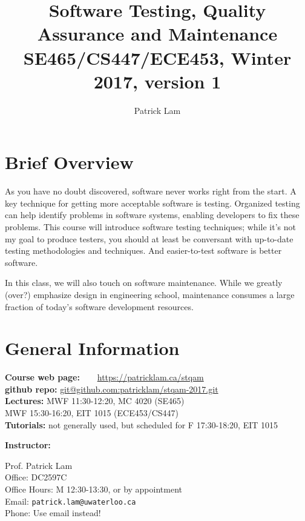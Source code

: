 \documentclass{article}
\begin{document}
\title{Software Testing, Quality Assurance and Maintenance\\SE465/CS447/ECE453, Winter 2017, version 1}
\author{Patrick Lam}
\renewcommand{\today}{}
\maketitle
\vspace*{-2em}

\section*{Brief Overview}
As you have no doubt discovered, software never works right from the
start. A key technique for getting more acceptable software is
testing. Organized testing can help identify problems in software
systems, enabling developers to fix these problems.  This course will
introduce software testing techniques; while it's not my goal
to produce testers, you should at least be conversant
with up-to-date testing methodologies and techniques. And easier-to-test
software is better software.

In this class, we will also touch on software maintenance. While we
greatly (over?) emphasize design in engineering school, maintenance
consumes a large fraction of today's software development resources.

\section*{General Information}

\noindent
\begin{tabbing}
  {\bf Course web page:~~~} \= \url{https://patricklam.ca/stqam}\\
  {\bf github repo:}\> \url{git@github.com:patricklam/stqam-2017.git}\\
  {\bf Lectures:} \> MWF 11:30-12:20, MC 4020 (SE465)\\
\> MWF 15:30-16:20, EIT 1015 (ECE453/CS447)\\
{\bf Tutorials:} \> not generally used, but scheduled for F 17:30-18:20, EIT 1015
\end{tabbing}

\noindent
{\bf Instructor:} \\

\noindent
\hspace*{2em} \begin{minipage}{.6\textwidth}
Prof. Patrick Lam\\
Office: DC2597C\\
Office Hours: M 12:30-13:30, or by appointment\\
Email: {\tt patrick.lam@uwaterloo.ca}\\
Phone: Use email instead!

\end{minipage} \\[1em]
\end{document}
